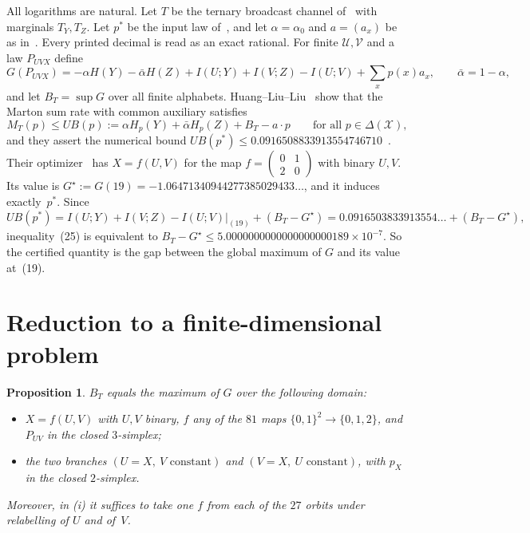 \documentclass[11pt,draftclsnofoot,onecolumn,journal]{IEEEtran}
\newtheorem{proposition}{Proposition}
\newcommand{\ab}{\bar\alpha}
\begin{document}
All logarithms are natural. Let $T$ be the ternary broadcast channel of~\cite[(14)--(15)]{HLL}
with marginals $T_Y,T_Z$. Let $p^*$ be the input law of~\cite[(16)]{HLL}, and let
$\alpha=\alpha_0$ and $a=(a_x)$ be as in~\cite[(17)]{HLL}. Every printed decimal is read as an
exact rational. For finite $\mathcal U,\mathcal V$ and a law $P_{UVX}$ define
\[
G(P_{UVX})=-\alpha H(Y)-\ab H(Z)+I(U;Y)+I(V;Z)-I(U;V)+\textstyle\sum_x p(x)a_x,\qquad \ab=1-\alpha,
\]
and let $B_T=\sup G$ over all finite alphabets. Huang--Liu--Liu~\cite[(23)--(24)]{HLL} show that the
Marton sum rate with common auxiliary satisfies
\[
M_T(p)\le UB(p):=\alpha H_p(Y)+\ab H_p(Z)+B_T-a\cdot p\qquad\text{for all }p\in\Delta(\mathcal X),
\]
and they assert the numerical bound $UB(p^*)\le 0.0916508833913554746710$~\cite[(25)]{HLL}. Their
optimizer~\cite[(19)]{HLL} has $X=f(U,V)$ for the map $f=\left(\begin{smallmatrix}0&1\\2&0\end{smallmatrix}\right)$
with binary $U,V$. Its value is
$G^\star:=G(19)=-1.06471340944277385029433\ldots$, and it induces exactly~$p^*$. Since
\[
UB(p^*)=I(U;Y)+I(V;Z)-I(U;V)\big|_{(19)}+(B_T-G^\star)=0.0916503833913554\ldots+(B_T-G^\star),
\]
inequality~(25) is equivalent to $B_T-G^\star\le 5.0000000000000000000189\times10^{-7}$. So the
certified quantity is the gap between the global maximum of $G$ and its value at~(19).

\section{Reduction to a finite-dimensional problem}

\begin{proposition}\label{prop:red}
$B_T$ equals the maximum of $G$ over the following domain:
\begin{itemize}
\item[(i)] $X=f(U,V)$ with $U,V$ binary, $f$ any of the $81$ maps $\{0,1\}^2\to\{0,1,2\}$, and $P_{UV}$ in the
closed $3$-simplex;
\item[(ii)] the two branches $(U=X,\ V\text{ constant})$ and $(V=X,\ U\text{ constant})$, with $p_X$ in the closed $2$-simplex.
\end{itemize}
Moreover, in (i) it suffices to take one $f$ from each of the $27$ orbits under relabelling of $U$ and of~$V$.
\end{proposition}
\end{document}
